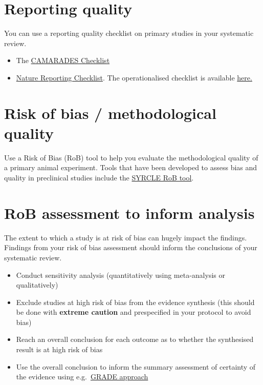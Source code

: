\documentclass[
]{book}
\providecommand{\tightlist}{%
  \setlength{\itemsep}{0pt}\setlength{\parskip}{0pt}}
\begin{document}
\hypertarget{reporting-quality}{%
\section{Reporting quality}\label{reporting-quality}}

You can use a reporting quality checklist on primary studies in your systematic review.

\begin{itemize}
\tightlist
\item
  The \href{https://www.ahajournals.org/doi/pdf/10.1161/01.str.0000125719.25853.20}{CAMARADES Checklist}
\item
  \href{https://www.gene-quantification.de/checklist-for-life-sciences-articles.pdf}{Nature Reporting Checklist}. The operationalised checklist is available \href{https://link.springer.com/article/10.1007/s11192-016-1964-8/tables/6}{here.}
\end{itemize}

\hypertarget{risk-of-bias-methodological-quality}{%
\section{Risk of bias / methodological quality}\label{risk-of-bias-methodological-quality}}

Use a Risk of Bias (RoB) tool to help you evaluate the methodological quality of a primary animal experiment. Tools that have been developed to assess bias and quality in preclinical studies include the \href{https://bmcmedresmethodol.biomedcentral.com/track/pdf/10.1186/1471-2288-14-43}{SYRCLE RoB tool}.

\hypertarget{rob-assessment-to-inform-analysis}{%
\section{RoB assessment to inform analysis}\label{rob-assessment-to-inform-analysis}}

The extent to which a study is at risk of bias can hugely impact the findings. Findings from your risk of bias assessment should inform the conclusions of your systematic review.

\begin{itemize}
\tightlist
\item
  Conduct sensitivity analysis (quantitatively using meta-analysis or qualitatively)
\item
  Exclude studies at high risk of bias from the evidence synthesis (this should be done with \textbf{extreme caution} and prespecified in your protocol to avoid bias)
\item
  Reach an overall conclusion for each outcome as to whether the synthesised result is at high risk of bias
\item
  Use the overall conclusion to inform the summary assessment of certainty of the evidence using e.g.~\href{https://bestpractice.bmj.com/info/toolkit/learn-ebm/what-is-grade/}{GRADE approach}
\end{itemize}
\end{document}
